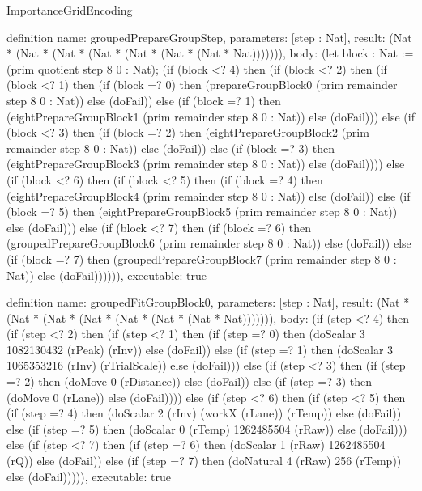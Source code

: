 \begin{lexlean}{ImportanceGridEncoding}
\begin{semanticmodule}
definition{
  name: groupedPrepareGroupStep,
  parameters: [step : Nat],
  result: (Nat * (Nat * (Nat * (Nat * (Nat * (Nat * (Nat * Nat))))))),
  body: (let block : Nat := (prim quotient step 8 0 : Nat); (if (block <? 4) then
      (if (block <? 2) then
      (if (block <? 1) then
      (if (block =? 0) then (prepareGroupBlock0 (prim remainder step 8 0 : Nat)) else (doFail)) else
      (if (block =? 1) then (eightPrepareGroupBlock1 (prim remainder step 8 0 : Nat)) else (doFail))) else
      (if (block <? 3) then
      (if (block =? 2) then (eightPrepareGroupBlock2 (prim remainder step 8 0 : Nat)) else (doFail)) else
      (if (block =? 3) then (eightPrepareGroupBlock3 (prim remainder step 8 0 : Nat)) else (doFail)))) else
      (if (block <? 6) then
      (if (block <? 5) then
      (if (block =? 4) then (eightPrepareGroupBlock4 (prim remainder step 8 0 : Nat)) else (doFail)) else
      (if (block =? 5) then (eightPrepareGroupBlock5 (prim remainder step 8 0 : Nat)) else (doFail))) else
      (if (block <? 7) then
      (if (block =? 6) then (groupedPrepareGroupBlock6 (prim remainder step 8 0 : Nat)) else (doFail)) else
      (if (block =? 7) then (groupedPrepareGroupBlock7 (prim remainder step 8 0 : Nat)) else (doFail)))))),
  executable: true
}

definition{
  name: groupedFitGroupBlock0,
  parameters: [step : Nat],
  result: (Nat * (Nat * (Nat * (Nat * (Nat * (Nat * (Nat * Nat))))))),
  body: (if (step <? 4) then
      (if (step <? 2) then
      (if (step <? 1) then
      (if (step =? 0) then (doScalar 3 1082130432 (rPeak) (rInv)) else (doFail)) else
      (if (step =? 1) then (doScalar 3 1065353216 (rInv) (rTrialScale)) else (doFail))) else
      (if (step <? 3) then
      (if (step =? 2) then (doMove 0 (rDistance)) else (doFail)) else
      (if (step =? 3) then (doMove 0 (rLane)) else (doFail)))) else
      (if (step <? 6) then
      (if (step <? 5) then
      (if (step =? 4) then (doScalar 2 (rInv) (workX (rLane)) (rTemp)) else (doFail)) else
      (if (step =? 5) then (doScalar 0 (rTemp) 1262485504 (rRaw)) else (doFail))) else
      (if (step <? 7) then
      (if (step =? 6) then (doScalar 1 (rRaw) 1262485504 (rQ)) else (doFail)) else
      (if (step =? 7) then (doNatural 4 (rRaw) 256 (rTemp)) else (doFail))))),
  executable: true
}


\end{semanticmodule}
\end{lexlean}
